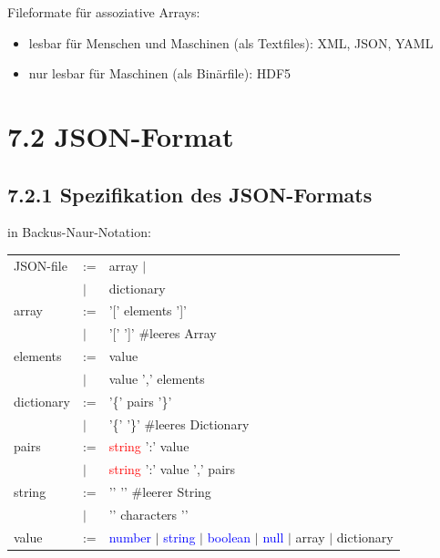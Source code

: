 \documentclass[11pt, fleqn]{scrreprt}
\begin{document}
Fileformate für assoziative Arrays:
\begin{itemize}
	\item lesbar für Menschen und Maschinen (als Textfiles): XML, JSON, YAML
	\item nur lesbar für Maschinen (als Binärfile): HDF5
\end{itemize}

\section*{7.2 JSON-Format}
\subsection*{7.2.1 Spezifikation des JSON-Formats}
in Backus-Naur-Notation: \\
\begin{tabular}{L{2cm} C{1cm} L{10cm}}
	JSON-file & := & array $|$ \\
	& $|$ & dictionary \\
	array & := & '[' \hspace*{5mm} elements \hspace*{5mm} ']'\\
	& $|$ & '[' \hspace*{1cm} ']'  \hspace*{1cm} \#leeres Array\\
	elements & := & value \\
	& $|$ & value ',' elements \\
	dictionary & := & '\{' \hspace*{5mm} pairs \hspace*{5mm} '\}' \\
	& $|$ & '\{' \hspace*{1cm} '\}'\hspace*{1cm} \#leeres Dictionary \\
	pairs & := & \textcolor{red}{string} ':' value \\
	& $|$ & \textcolor{red}{string} ':' value ',' pairs \\
	string & := & '\grqq' \hspace*{5mm} '\grqq'\hspace*{1.3cm} \#leerer String\\
	& $|$ & '\grqq' characters '\grqq' \\
	value & := & \textcolor{blue}{number} $|$ \textcolor{blue}{string} $|$ \textcolor{blue}{boolean} $|$ \textcolor{blue}{null} $|$ array $|$ dictionary\\ 
\end{tabular}\\
\end{document}
